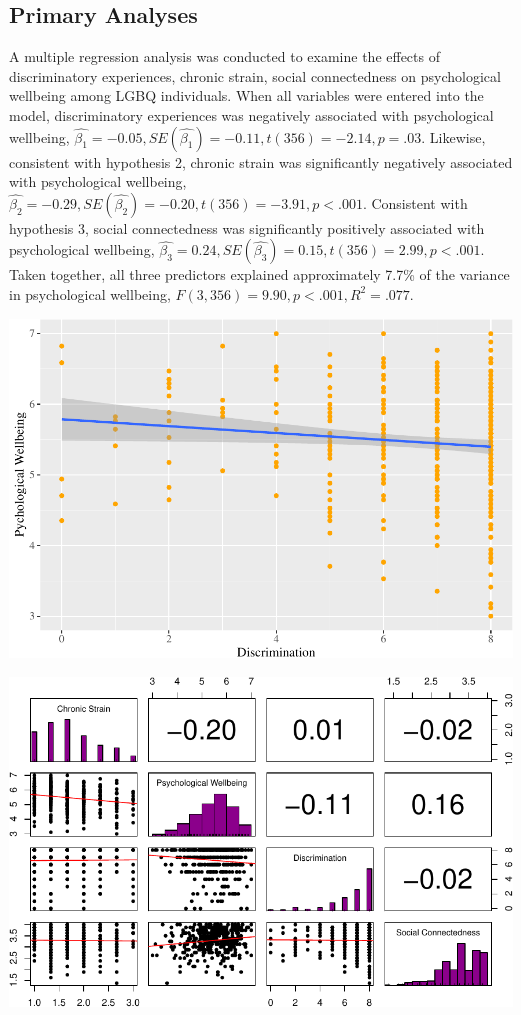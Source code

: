 \documentclass[
  english,
  man,floatsintext]{apa6}
\begin{document}
\hypertarget{primary-analyses}{%
\subsection{Primary Analyses}\label{primary-analyses}}

A multiple regression analysis was conducted to examine the effects of discriminatory experiences, chronic strain, social connectedness on psychological wellbeing among LGBQ individuals. When all variables were entered into the model, discriminatory experiences was negatively associated with psychological wellbeing, \(\hat{\beta_{1}}=-0.05, SE(\hat{\beta_{1}})=-0.11, t(356)=-2.14, p=.03\). Likewise, consistent with hypothesis 2, chronic strain was significantly negatively associated with psychological wellbeing, \(\hat{\beta_{2}}=-0.29, SE(\hat{\beta_{2}})=-0.20, t(356)=-3.91, p < .001\). Consistent with hypothesis 3, social connectedness was significantly positively associated with psychological wellbeing, \(\hat{\beta_{3}}=0.24, SE(\hat{\beta_{3}})=0.15, t(356)=2.99, p < .001\). Taken together, all three predictors explained approximately 7.7\% of the variance in psychological wellbeing, \(F(3,356)=9.90, p<.001, R^{2}=.077\).

\includegraphics{prep_script_files/figure-latex/regplot-1.pdf}

\includegraphics{prep_script_files/figure-latex/correlation panels-1.pdf}
\end{document}
